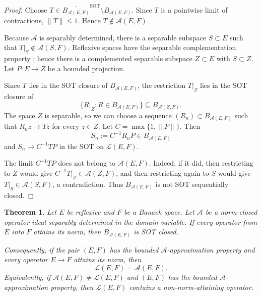 \documentclass[11pt]{amsart}
\newtheorem{theorem}{Theorem}
\newcommand{\A}{\mathcal A}
\newcommand{\Lin}{\mathcal L}
\newcommand{\SOT}{\operatorname{SOT}}
\newcommand{\Ball}{B}
\begin{document}
\begin{proof}
Choose \(T\in \overline{\Ball_{\A(E,F)}}^{\SOT}\setminus
\Ball_{\A(E,F)}\).  Since \(T\) is a pointwise limit of contractions, \(\|T\|\leq
1\).  Hence \(T\notin \A(E,F)\).

Because \(\A\) is separably determined, there is a separable subspace
\(S\subset E\) such that \(T|_S\notin \A(S,F)\).  Reflexive spaces have the
separable complementation property \cite[Lemma 3.5 and its proof]{DJM}; hence
there is a complemented separable subspace \(Z\subset E\) with \(S\subset Z\).
Let \(P:E\to Z\) be a bounded projection.

Since \(T\) lies in the SOT closure of \(\Ball_{\A(E,F)}\), the restriction
\(T|_Z\) lies in the SOT closure of
\[
\{R|_Z:R\in \Ball_{\A(E,F)}\}\subseteq \Ball_{\A(Z,F)}.
\]
The space \(Z\) is separable, so we can choose a sequence
\((R_n)\subset \Ball_{\A(E,F)}\) such that \(R_n z\to Tz\) for every \(z\in Z\).
Let \(C=\max\{1,\|P\|\}\).  Then
\[
S_n:=C^{-1}R_nP\in \Ball_{\A(E,F)}
\]
and \(S_n\to C^{-1}TP\) in the SOT on \(\Lin(E,F)\).

The limit \(C^{-1}TP\) does not belong to \(\A(E,F)\).  Indeed, if it did, then
restricting to \(Z\) would give \(C^{-1}T|_Z\in\A(Z,F)\), and then restricting
again to \(S\) would give \(T|_S\in\A(S,F)\), a contradiction.  Thus
\(\Ball_{\A(E,F)}\) is not SOT sequentially closed.
\end{proof}

\begin{theorem}\label{thm:main}
Let \(E\) be reflexive and \(F\) be a Banach space.  Let \(\A\) be a
norm-closed operator ideal separably determined in the domain variable.  If
every operator from \(E\) into \(F\) attains its norm, then
\(\Ball_{\A(E,F)}\) is SOT closed.

Consequently, if the pair \((E,F)\) has the bounded \(\A\)-approximation
property and every operator \(E\to F\) attains its norm, then
\[
\Lin(E,F)=\A(E,F).
\]
Equivalently, if \(\A(E,F)\neq \Lin(E,F)\) and \((E,F)\) has the bounded
\(\A\)-approximation property, then \(\Lin(E,F)\) contains a non-norm-attaining
operator.
\end{theorem}
\end{document}
